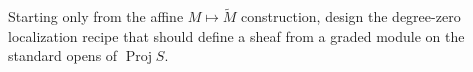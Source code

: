 \begin{problem}
Starting only from the affine $M\mapsto\widetilde M$ construction, design the degree-zero localization recipe that should define a sheaf from a graded module on the standard opens of $\operatorname{Proj}S$.
\end{problem}
